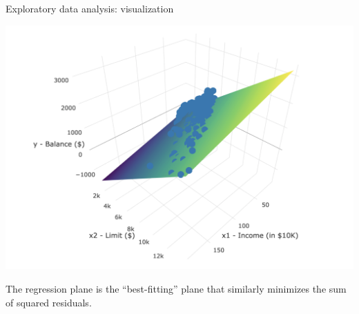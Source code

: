 \documentclass[
  ignorenonframetext,
]{beamer}
\begin{document}
\begin{frame}{Exploratory data analysis: visualization}
\protect\hypertarget{exploratory-data-analysis-visualization-3}{}
\begin{center}\includegraphics[width=0.7\linewidth,height=0.5\textheight]{week5_7} \end{center}

The regression plane is the ``best-fitting'' plane that similarly
minimizes the sum of squared residuals.
\end{frame}
\end{document}
